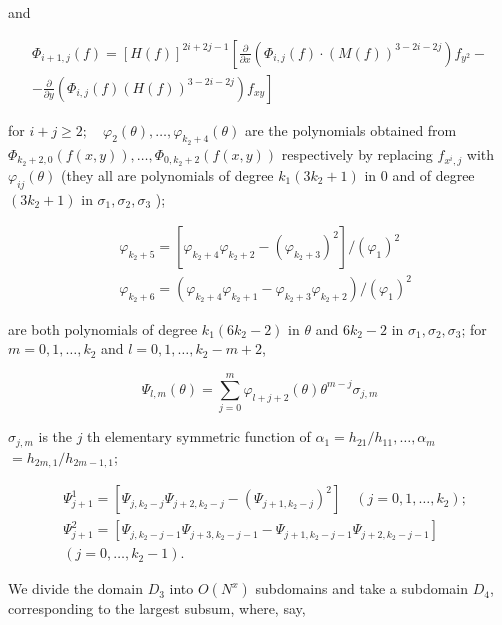 \documentclass[10pt]{article}
\begin{document}
and

$$
\begin{array}{r}
\Phi_{i+1, j}(f)=[H(f)]^{2 i+2 j-1}\left[\frac{\partial}{\partial x}\left(\Phi_{i, j}(f) \cdot(M(f))^{3-2 i-2 j}\right) f_{y^{2}}-\right. \\
\left.-\frac{\partial}{\partial y}\left(\Phi_{i, j}(f)(H(f))^{3-2 i-2 j}\right) f_{x y}\right]
\end{array}
$$

for $i+j \geqslant 2 ; \quad \varphi_{2}(\theta), \ldots, \varphi_{k_{2}+4}(\theta)$ are the polynomials obtained from $\Phi_{k_{2}+2,0}(f(x, y)), \ldots, \Phi_{0, k_{2}+2}(f(x, y))$ respectively by replacing $f_{x^{i}, j}$ with $\varphi_{i j}(\theta)$ (they all are polynomials of degree $k_{1}\left(3 k_{2}+1\right)$ in 0 and of degree $\left(3 k_{2}+1\right)$ in $\sigma_{1}, \sigma_{2}, \sigma_{3}$ );

$$
\begin{aligned}
& \varphi_{k_{2}+5}=\left[\varphi_{k_{2}+4} \varphi_{k_{2}+2}-\left(\varphi_{k_{2}+3}\right)^{2}\right] /\left(\varphi_{1}\right)^{2} \\
& \varphi_{k_{2}+6}=\left(\varphi_{k_{2}+4} \varphi_{k_{2}+1}-\varphi_{k_{2}+3} \varphi_{k_{2}+2}\right) /\left(\varphi_{1}\right)^{2}
\end{aligned}
$$

are both polynomials of degree $k_{1}\left(6 k_{2}-2\right)$ in $\theta$ and $6 k_{2}-2$ in $\sigma_{1}, \sigma_{2}, \sigma_{3}$; for $m=0,1, \ldots, k_{2}$ and $l=0,1, \ldots, k_{2}-m+2$,

$$
\Psi_{l, m}(\theta)=\sum_{j=0}^{m} \varphi_{l+j+2}(\theta) \theta^{m-j} \sigma_{j, m}
$$

$\sigma_{j, m}$ is the $j$ th elementary symmetric function of $\alpha_{1}=h_{21} / h_{11}, \ldots, \alpha_{m}$ $=h_{2 m, 1} / h_{2 m-1,1}$;

$$
\begin{aligned}
& \Psi_{j+1}^{1}=\left[\Psi_{j, k_{2}-j} \Psi_{j+2, k_{2}-j}-\left(\Psi_{j+1, k_{2}-j}\right)^{2}\right] \quad\left(j=0,1, \ldots, k_{2}\right) ; \\
& \Psi_{j+1}^{2}=\left[\Psi_{j, k_{2}-j-1} \Psi_{j+3, k_{2}-j-1}-\Psi_{j+1, k_{2}-j-1} \Psi_{j+2, k_{2}-j-1}\right] \\
& \left(j=0, \ldots, k_{2}-1\right) .
\end{aligned}
$$

We divide the domain $D_{3}$ into $O\left(N^{x}\right)$ subdomains and take a subdomain $D_{4}$, corresponding to the largest subsum, where, say,
\end{document}
